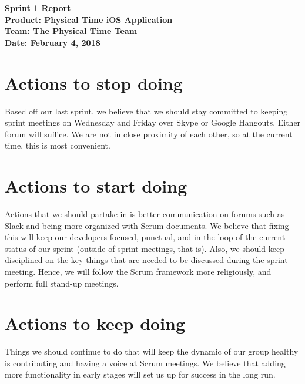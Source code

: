 \documentclass[11pt]{article}
\newcommand\tab[1][1cm]{\hspace*{#1}}
\begin{document}
	\Large{\textbf{Sprint 1 Report}}\\
	\Large{\textbf{Product: Physical Time iOS Application}}\\
	\Large{\textbf{Team: The Physical Time Team}}\\
	\Large{\textbf{Date: February 4, 2018}}\\
	
	\vspace{-3mm}
	
	\section{Actions to stop doing}
		\vspace{-3mm}
		\tab \normalsize{Based off our last sprint, we believe that we should stay committed to keeping sprint meetings on Wednesday and Friday over Skype or Google Hangouts. Either forum will suffice. We are not in close proximity of each other, so at the current time, this is most convenient.}
		
	\section{Actions to start doing}
		\vspace{-3mm}
		\tab \normalsize{Actions that we should partake in is better communication on forums such as Slack and being more organized with Scrum documents. We believe that fixing this will keep our developers focused, punctual, and in the loop of the current status of our sprint (outside of sprint meetings, that is). Also, we should keep disciplined on the key things that are needed to be discussed during the sprint meeting. Hence, we will follow the Scrum framework more religiously, and perform full stand-up meetings.}
		
	\section{Actions to keep doing}
		\vspace{-3mm}
		\tab \normalsize{Things we should continue to do that will keep the dynamic of our group healthy is contributing and having a voice at Scrum meetings. We believe that adding more functionality in early stages will set us up for success in the long run.}
		
\end{document}
